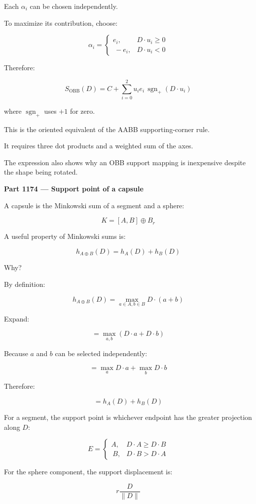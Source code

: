 Each \(\alpha_i\) can be chosen independently.

To maximize its contribution, choose:

\[
\alpha_i= \begin{cases} e_i,&D\cdot u_i\ge0\\\ -e_i,&D\cdot u_i<0 \end{cases}
\]

Therefore:

\[
\boxed{ S_{\mathrm{OBB}}(D)= C+\sum_{i=0}^2 u_i e_i\,\operatorname{sgn}_+(D\cdot u_i) }
\]

where \(\operatorname{sgn}_+\) uses \(+1\) for zero.

This is the oriented equivalent of the AABB supporting-corner rule.

It requires three dot products and a weighted sum of the axes.

The expression also shows why an OBB support mapping is inexpensive despite the shape being rotated.

\textbf{Part 1174 --- Support point of a capsule}

A capsule is the Minkowski sum of a segment and a sphere:

\[
K=[A,B]\oplus B_r
\]

A useful property of Minkowski sums is:

\[
\boxed{ h_{A\oplus B}(D)=h_A(D)+h_B(D) }
\]

Why?

By definition:

\[
h_{A\oplus B}(D) = \max_{a\in A,b\in B}D\cdot(a+b)
\]

Expand:

\[
=\max_{a,b}(D\cdot a+D\cdot b)
\]

Because \(a\) and \(b\) can be selected independently:

\[
=\max_a D\cdot a+\max_b D\cdot b
\]

Therefore:

\[
=h_A(D)+h_B(D)
\]

For a segment, the support point is whichever endpoint has the greater projection along \(D\):

\[
E= \begin{cases} A,&D\cdot A\ge D\cdot B\\\ B,&D\cdot B>D\cdot A \end{cases}
\]

For the sphere component, the support displacement is:

\[
r\frac{D}{\|D\|}
\]

